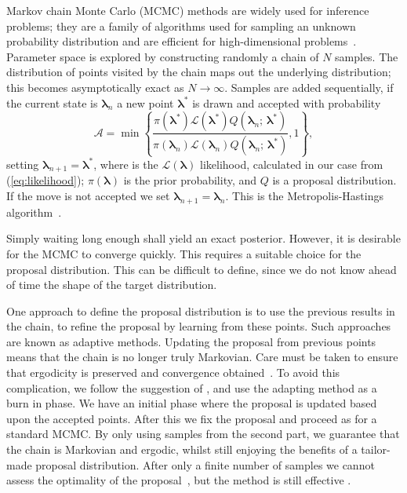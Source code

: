 \documentclass[useAMS,usedcolumn,usegraphicx,usenatbib]{mn2e}
\newcommand{\eqnref}[1]{(\ref{eq:#1})}
\begin{document}
Markov chain Monte Carlo (MCMC) methods are widely used for inference problems; they are a family of algorithms used for sampling an unknown probability distribution and are efficient for high-dimensional problems~\citep[chapter 29]{MacKay2003}. Parameter space is explored by constructing randomly a chain of $N$ samples. The distribution of points visited by the chain maps out the underlying distribution; this becomes asymptotically exact as $N \rightarrow \infty$. Samples are added sequentially, if the current state is $\boldsymbol{\lambda}_n$ a new point $\boldsymbol{\lambda}^\ast$ is drawn and accepted with probability
\begin{equation}
\mathcal{A} = \min\left\{\frac{\pi(\boldsymbol{\lambda}^\ast)\mathcal{L}(\boldsymbol{\lambda}^\ast)Q(\boldsymbol{\lambda}_n;\,\boldsymbol{\lambda}^\ast)}{\pi(\boldsymbol{\lambda}_n)\mathcal{L}(\boldsymbol{\lambda}_n)Q(\boldsymbol{\lambda}_n;\,\boldsymbol{\lambda}^\ast)}, 1\right\},
\end{equation}
setting $\boldsymbol{\lambda}_{n + 1} = \boldsymbol{\lambda}^\ast$, where is the $\mathcal{L}(\boldsymbol{\lambda})$ likelihood, calculated in our case from \eqnref{likelihood}; $\pi(\boldsymbol{\lambda})$ is the prior probability, and $Q$ is a proposal distribution. If the move is not accepted we set $\boldsymbol{\lambda}_{n + 1} = \boldsymbol{\lambda}_n$. This is the Metropolis-Hastings algorithm~\citep{Metropolis1953,Hastings1970}.

Simply waiting long enough shall yield an exact posterior. However, it is desirable for the MCMC to converge quickly. This requires a suitable choice for the proposal distribution. This can be difficult to define, since we do not know ahead of time the shape of the target distribution.

One approach to define the proposal distribution is to use the previous results in the chain, to refine the proposal by learning from these points. Such approaches are known as adaptive methods. Updating the proposal from previous points means that the chain is no longer truly Markovian. Care must be taken to ensure that ergodicity is preserved and convergence obtained~\citep{Roberts2007,Andrieu2008}. To avoid this complication, we follow the suggestion of \citet{Haario1999}, and use the adapting method as a burn in phase. We have an initial phase where the proposal is updated based upon the accepted points. After this we fix the proposal and proceed as for a standard MCMC. By only using samples from the second part, we guarantee that the chain is Markovian and ergodic, whilst still enjoying the benefits of a tailor-made proposal distribution. After only a finite number of samples we cannot assess the optimality of the proposal~\citep{Andrieu2008}, but the method is still effective .
\end{document}
